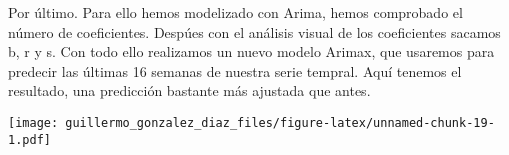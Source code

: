 \documentclass[
]{article}
\begin{document}
Por último. Para ello hemos modelizado con Arima, hemos comprobado el
número de coeficientes. Despúes con el análisis visual de los
coeficientes sacamos b, r y s. Con todo ello realizamos un nuevo modelo
Arimax, que usaremos para predecir las últimas 16 semanas de nuestra
serie tempral. Aquí tenemos el resultado, una predicción bastante más
ajustada que antes.

\texttt{[image: guillermo\_gonzalez\_diaz\_files/figure-latex/unnamed-chunk-19-1.pdf]}
\end{document}
